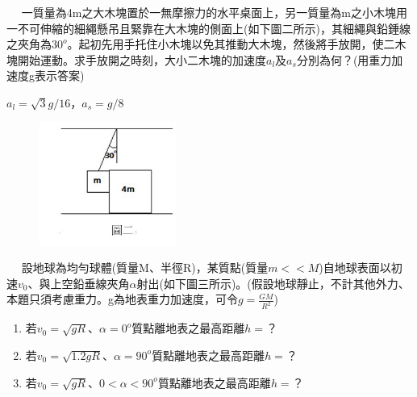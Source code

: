\documentclass[cn,10pt,math=newtx,chinesefont=founder]{elegantbook}
\begin{document}
\newpage


\begin{example}　
    一質量為4m之大木塊置於一無摩擦力的水平桌面上，另一質量為m之小木塊用一不可伸縮的細繩懸吊且緊靠在大木塊的側面上(如下圖二所示)，其細繩與鉛錘線之夾角為$30^o$。起初先用手托住小木塊以免其推動大木塊，然後將手放開，使二木塊開始運動。求手放開之時刻，大小二木塊的加速度$a_l$及$a_s$分別為何？(用重力加速度g表示答案) 
    
    \rightline{[2]}
\end{example}

\begin{solution}
$a_l=\sqrt{3}g/16$，$a_s=g/8$
\end{solution}

\begin{figure}[htbp]
\flushright
\includegraphics[width=0.4\textwidth]{image/2.JPG}
\end{figure}

\newpage


\begin{example}　
    設地球為均勻球體(質量M、半徑R)，某質點(質量$m<<M$)自地球表面以初速$v_0$、與上空鉛垂線夾角$\alpha$射出(如下圖三所示)。(假設地球靜止，不計其他外力、本題只須考慮重力。g為地表重力加速度，可令$g=\frac{GM}{R^2}$)
    \begin{enumerate}[label=(\arabic*)]
    \item 若$v_0=\sqrt{gR}$、$\alpha=0^o$質點離地表之最高距離$h=$？  
    \item 若$v_0=\sqrt{1.2gR}$、$\alpha=90^o$質點離地表之最高距離$h=$？
    \item 若$v_0=\sqrt{gR}$、$0<\alpha<90^o$質點離地表之最高距離$h=$？
    \end{enumerate}
    
    \rightline{[3]}
\end{example}

\begin{solution}

\end{solution}
\end{document}
